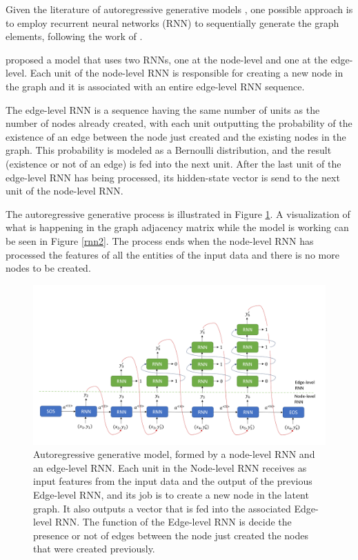 \documentclass[12pt,a4paper]{article}
\begin{document}
	Given the literature of autoregressive generative models \citep{Li2018, You2018, Liao2019}, one possible approach is to employ recurrent neural networks (RNN) to sequentially generate the graph elements, following the work of \textcite{You2018}.
	
	\textcite{You2018} proposed a model that uses two RNNs, one at the node-level and one at the edge-level. Each unit of the node-level RNN is responsible for creating a new node in the graph and it is associated with an entire edge-level RNN sequence. 
	
	The edge-level RNN is a sequence having the same number of units as the number of nodes already created, with each unit outputting the probability of the existence of an edge between the node just created and the existing nodes in the graph. This probability is modeled as a Bernoulli distribution, and the result (existence or not of an edge) is fed into the next unit. After the last unit of the edge-level RNN has being processed, its hidden-state vector is send to the next unit of the node-level RNN.
	
	The autoregressive generative process is illustrated in Figure \ref{rnn1}. A visualization of what is happening in the graph adjacency matrix while the model is working can be seen in Figure \ref{rnn2}. The process ends when the node-level RNN has processed the features of all the entities of the input data and there is no more nodes to be created.

	\begin{figure}[hbtp]
	\includegraphics[width=\textwidth]{rnn.png}
	\caption{Autoregressive generative model, formed by a node-level RNN and an edge-level RNN. Each unit in the Node-level RNN receives as input features from the input data and the output of the previous Edge-level RNN, and its job is to create a new node in the latent graph. It also outputs a vector that is fed into the associated Edge-level RNN. The function of the Edge-level RNN is decide the presence or not of edges between the node just created the nodes that were created previously. \label{rnn1}}
	\end{figure}
\end{document}
